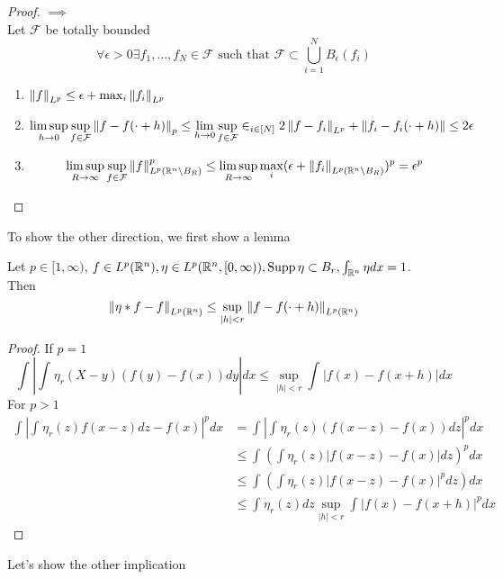 \documentclass[../main.tex]{subfiles}
\begin{document}
\begin{proof}
$\implies$\\
Let $\mathcal{F}$ be totally bounded
\[ 
\forall\epsilon>0\exists f_1,\ldots,f_N \in \mathcal{F} \text{ such that } \mathcal{F} \subset \bigcup_{i=1}^{N}B_\epsilon( f_i) 
\]
\begin{enumerate}
\item $\left\lVert f\right\rVert _{L^{p}} \leq \epsilon + \max_i \left\lVert f_i\right\rVert_{L^{p}} $ 
\item 
	\[ 
	\limsup_{h \to 0} \sup_{f \in \mathcal{F}} \left\lVert f- f( \cdot +h) \right\rVert_p \leq \lim_{h \to 0} \sup_{f \in \mathcal{F}} \in_{i \in [ N] } 2 \left\lVert f-f_i\right\rVert_{L^{p}} + \left\lVert f_i - f_i( \cdot +h) \right\rVert \leq  2\epsilon
	\]

\item 
	\[ 
		\limsup_{R \to \infty } \sup_{f \in \mathcal{F}} \left\lVert f\right\rVert _{L^{p}( \mathbb{R}^n\setminus B_R) } ^{p} \leq \limsup_{R\to \infty } \max_i ( \epsilon+ \left\lVert f_i\right\rVert_{L^{p}( \mathbb{R}^n\setminus B_R) } ) ^{p}= \epsilon^{p}
	\]
\end{enumerate}
\end{proof}
To show the other direction, we first show a lemma
\begin{lemma}
Let $p \in [ 1, \infty ) $, $f \in L^{p}( \mathbb{R}^n) , \eta \in L^{p}( \mathbb{R}^n, [ 0, \infty ) ), \operatorname{Supp} \eta \subset B_r, \int_{ \mathbb{R}^n }^{  } \eta dx =1$.\\
Then
\[ 
\left\lVert \eta\ast f - f \right\rVert_{L^{p}( \mathbb{R}^n) } \leq  \sup_{|h| < r} \left\lVert f- f( \cdot +h) \right\rVert_{L^{p}( \mathbb{R}^n) } 
\]

\end{lemma}
\begin{proof}
If $p=1$
\[ 
\int_{  }^{  }| \int_{  }^{  } \eta_r( X-y) ( f( y) - f( x) ) dy| dx \leq \sup_{|h|<r} \int_{  }^{  }|f( x) - f( x+h) | dx
\]
For $p>1$ 
\begin{align*}
	\int_{  }^{  } | \int_{  }^{  }\eta_r( z) f( x-z) dz - f( x) |^{p} dx &= \int_{  }^{  }| \int_{  }^{  }\eta_r( z) ( f( x-z) - f( x) ) dz|^{p} dx\\
	& \leq  \int_{  }^{  }( \int \eta_r( z) |f( x-z)- f( x) | dz )^{p} dx\\
	&\leq \int_{  }^{  }( \int \eta_r( z) |f( x-z) - f( x) |^{p}dz) dx\\
	& \leq \int_{  }^{  }\eta_r( z) dz \sup_{|h|< r} \int_{  }^{  }|f( x) - f( x+h) |^{p}dx
\end{align*}
\end{proof}
Let's show the other implication
\end{document}
